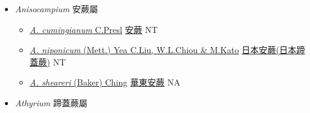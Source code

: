 
  \begin{itemize}
 \item[] \textit{Anisocampium} 安蕨屬
                    
  \begin{itemize}
        \item[] \href{http://www.theplantlist.org/tpl1.1/search?q=Anisocampium+cumingianum}{\textit{A. cumingianum} C.Presl}   \href{\detokenize{http://taibnet.sinica.edu.tw/chi/taibnet_species_list.php?T2=安蕨&T2_new_value=true&fr=y}}{安蕨} NT
        \item[] \href{http://www.theplantlist.org/tpl1.1/search?q=Anisocampium+niponicum}{\textit{A. niponicum} (Mett.) Yea C.Liu, W.L.Chiou \& M.Kato}     \href{\detokenize{http://taibnet.sinica.edu.tw/chi/taibnet_species_list.php?T2=日本安蕨&T2_new_value=true&fr=y}}{日本安蕨(日本蹄蓋蕨)}   NT
        \item[] \href{http://www.theplantlist.org/tpl1.1/search?q=Anisocampium+sheareri}{\textit{A. sheareri} (Baker) Ching}   \href{\detokenize{http://taibnet.sinica.edu.tw/chi/taibnet_species_list.php?T2=華東安蕨&T2_new_value=true&fr=y}}{華東安蕨} NA
  \end{itemize}
 \item[] \textit{Athyrium} 蹄蓋蕨屬
                    

\end{itemize}
